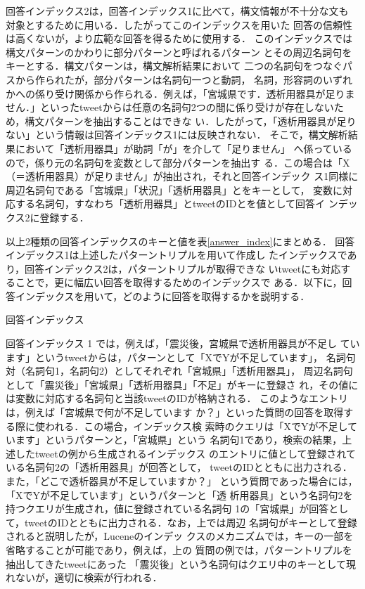 \documentclass[japanese]{jnlp_1.4}
\begin{document}
回答インデックス2は，回答インデックス1に比べて，構文情報が不十分な文も
対象とするために用いる．したがってこのインデックスを用いた
回答の信頼性は高くないが，より広範な回答を得るために使用する．
このインデックスでは構文パターンのかわりに部分パターンと呼ばれるパターン
とその周辺名詞句をキーとする．構文パターンは，構文解析結果において
二つの名詞句をつなぐパスから作られたが，部分パターンは名詞句一つと動詞，
名詞，形容詞のいずれかへの係り受け関係から作られる．例えば，「宮城県です．透析用器具が足りません．」といったtweetからは任意の名詞句2つの間に係り受けが存在しないため，構文パターンを抽出することはできな
い．したがって，「透析用器具が足りない」という情報は回答インデックス1には反映されない．
そこで，構文解析結果において「透析用器具」が助詞「が」を介して「足りません」
へ係っているので，係り元の名詞句を変数として部分パターンを抽出す
る．この場合は「X（＝透析用器具）が足りません」が抽出され，それと回答インデック
ス1同様に周辺名詞句である「宮城県」「状況」「透析用器具」とをキーとして，
変数に対応する名詞句，すなわち「透析用器具」とtweetのIDとを値として回答イ
ンデックス2に登録する．

以上2種類の回答インデックスのキーと値を表\ref{answer_index}にまとめる．
回答インデックス1は上述したパターントリプルを用いて作成し
たインデックスであり，回答インデックス2は，パターントリプルが取得できな
いtweetにも対応することで，更に幅広い回答を取得するためのインデックスで
ある．以下に，回答インデックスを用いて，どのように回答を取得するかを説明する．

\begin{table}[b]
\caption{回答インデックス}
\label{answer_index}

\end{table}

回答インデックス 1 では，例えば，「震災後，宮城県で透析用器具が不足し
ています」というtweetからは，パターンとして「XでYが不足しています」，
名詞句対（名詞句1，名詞句2）としてそれぞれ「宮城県」「透析用器具」，
周辺名詞句として「震災後」「宮城県」「透析用器具」「不足」がキーに登録さ
れ，その値には変数に対応する名詞句と当該tweetのIDが格納される．
このようなエントリは，例えば「宮城県で何が不足しています
か？」といった質問の回答を取得する際に使われる．この場合，インデックス検
索時のクエリは「XでYが不足しています」というパターンと，「宮城県」という
名詞句1であり，検索の結果，上述したtweetの例から生成されるインデックス
のエントリに値として登録されている名詞句2の「透析用器具」が回答として，
tweetのIDとともに出力される．また，「どこで透析器具が不足していますか？」
という質問であった場合には，「XでYが不足しています」というパターンと「透
析用器具」という名詞句2を持つクエリが生成され，値に登録されている名詞句
1の「宮城県」が回答として，tweetのIDとともに出力される．なお，上では周辺
名詞句がキーとして登録されると説明したが，Luceneのインデッ
クスのメカニズムでは，キーの一部を省略することが可能であり，例えば，上の
質問の例では，パターントリプルを抽出してきたtweetにあった
「震災後」という名詞句はクエリ中のキーとして現れないが，適切に検索が行われる．
\end{document}
